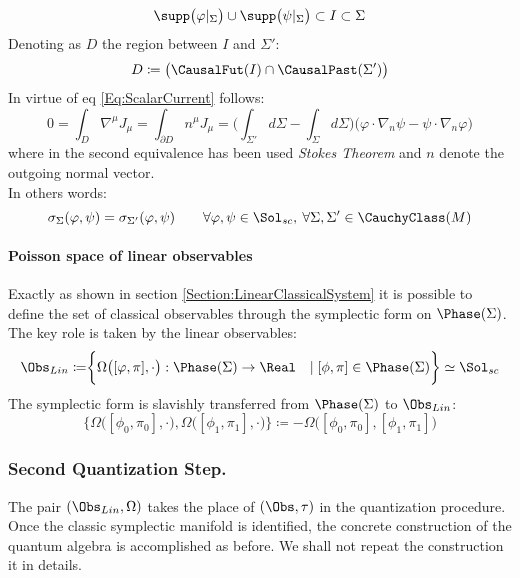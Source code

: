 \documentclass[Main]{subfiles}
\begin{document}
\begin{example}
\begin{displaymath}
				\supp\big(\varphi \vert_\Sigma \big) \cup \supp\big( \psi \vert_\Sigma \big) \subset I \subset \Sigma
			\end{displaymath}
			Denoting as $D$ the region between $I$ and $\Sigma'$:
			\begin{displaymath}
				D \coloneqq \big( \CausalFut(I) \cap \CausalPast(\Sigma') \big)
			\end{displaymath}
			In virtue of eq \ref{Eq:ScalarCurrent} follows:
			\begin{displaymath}
				0 = \int_{D} \nabla^\mu J_\mu = \int_{\partial D} n^\mu J_\mu = \big( \int_{\Sigma'} d\Sigma- \int_{\Sigma}d\Sigma \big) \big( \varphi \cdot \nabla_n \psi  - \psi \cdot \nabla_n \varphi \big) 
			\end{displaymath}
			where in the second equivalence has been used \emph{Stokes Theorem} and $n$ denote the outgoing normal vector.
			\\
			In others words:
			\begin{displaymath}
				\sigma_\Sigma ( \varphi, \psi) = \sigma_{\Sigma'} (\varphi, \psi) 
				\qquad \forall \varphi, \psi \in \Sol_{sc},\: \forall \Sigma, \Sigma' \in \CauchyClass(M)
			\end{displaymath}
			
			
		\end{example}
			
		\paragraph{Poisson space of linear observables}		
		Exactly as shown in section \ref{Section:LinearClassicalSystem} it is possible to define the set of classical observables through the symplectic form on $\Phase(\Sigma)$.
		The key role is taken by the linear observables:
		\begin{displaymath}
			\Obs_{Lin} \coloneqq \biggr\{ \Omega\big( [\varphi, \pi], \cdot \big): \Phase(\Sigma) \rightarrow \Real \quad \vert\; [\phi,\pi]\in \Phase(\Sigma) \biggr\}	\simeq \Sol_{sc}
		\end{displaymath}
		The symplectic form is slavishly transferred from $\Phase(\Sigma)$ to $\Obs_{Lin}$:
		\begin{displaymath}
			\biggr\{ \Omega\big( [\phi_0,\pi_0], \cdot \big) , \Omega \big( [\phi_1,\pi_1], \cdot \big) \biggr\} \coloneqq
			- \Omega\big( [\phi_0, \pi_0], [\phi_1, \pi_1]\big)
		\end{displaymath}				
		
	\subsubsection{Second Quantization Step.}
		The pair $(\Obs_{Lin}, \Omega)$ takes the place of $(\Obs, \tau)$ in the quantization procedure.
		Once the classic symplectic manifold is identified, the concrete construction of the quantum algebra is accomplished as before. We shall not repeat the construction it in details.
		
\end{document}
